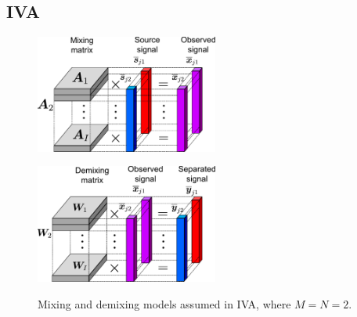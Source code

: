 \documentclass[10.5pt]{jarticle}
\begin{document}
\subsection{IVA}

\begin{figure}[htbp]
      \begin{minipage}[t]{0.45\hsize}
        \centering
        \includegraphics[keepaspectratio, width=6cm]{mixingiva.pdf}
        \label{fig:mixingiva}
      \end{minipage} 
      \begin{minipage}[t]{0.45\hsize}
        \centering
        \includegraphics[keepaspectratio, width=6cm]{demixingiva.pdf}
        \label{fig:demixingiva}
      \end{minipage} 
     \vspace{-10pt} %
     \caption{Mixing and demixing models assumed in IVA, where $M=N=2$.}
     \vspace{-15pt} %
     \label{fig:ivamodel}
  \end{figure}
\end{document}
